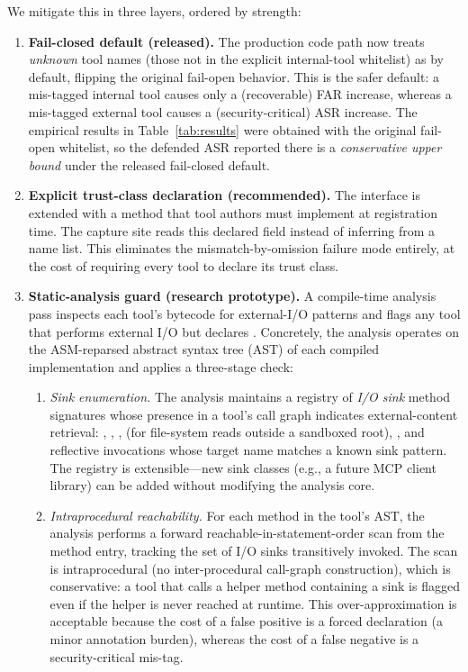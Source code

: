 We mitigate this in three layers, ordered by strength:

\begin{enumerate}[leftmargin=*]
    \item \textbf{Fail-closed default (released).} The production code path now treats \emph{unknown} tool names (those not in the explicit internal-tool whitelist) as  by default, flipping the original fail-open behavior. This is the safer default: a mis-tagged internal tool causes only a (recoverable) FAR increase, whereas a mis-tagged external tool causes a (security-critical) ASR increase. The empirical results in Table~\ref{tab:results} were obtained with the original fail-open whitelist, so the defended ASR reported there is a \emph{conservative upper bound} under the released fail-closed default.
    \item \textbf{Explicit trust-class declaration (recommended).} The  interface is extended with a  method that tool authors must implement at registration time. The capture site reads this declared field instead of inferring from a name list. This eliminates the mismatch-by-omission failure mode entirely, at the cost of requiring every tool to declare its trust class.
    \item \textbf{Static-analysis guard (research prototype).} A compile-time analysis pass inspects each tool's bytecode for external-I/O patterns and flags any tool that performs external I/O but declares . Concretely, the analysis operates on the ASM-reparsed abstract syntax tree (AST) of each compiled  implementation and applies a three-stage check:
    \begin{enumerate}[leftmargin=*,label=(\alph*)]
        \item \emph{Sink enumeration.} The analysis maintains a registry of \emph{I/O sink} method signatures whose presence in a tool's call graph indicates external-content retrieval: , , ,  (for file-system reads outside a sandboxed root), , and reflective invocations  whose target name matches a known sink pattern. The registry is extensible---new sink classes (e.g., a future MCP client library) can be added without modifying the analysis core.
        \item \emph{Intraprocedural reachability.} For each method in the tool's AST, the analysis performs a forward reachable-in-statement-order scan from the method entry, tracking the set of I/O sinks transitively invoked. The scan is intraprocedural (no inter-procedural call-graph construction), which is conservative: a tool that calls a helper method containing a sink is flagged even if the helper is never reached at runtime. This over-approximation is acceptable because the cost of a false positive is a forced  declaration (a minor annotation burden), whereas the cost of a false negative is a security-critical mis-tag.

\end{enumerate}
\end{enumerate}
